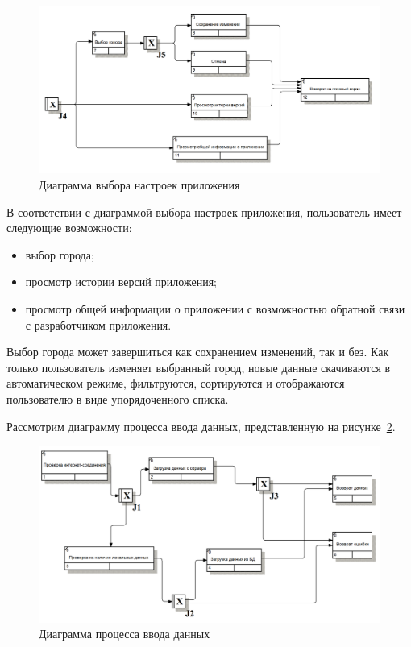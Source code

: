 \begin{figure}[h!]
  \centering
  \includegraphics[width=150mm]{pic/idef3_settings}
  \caption{Диаграмма выбора настроек приложения}
  \label{fig:idef3_settings}
\end{figure}

В соответствии с диаграммой выбора настроек приложения,
пользователь имеет следующие возможности:
\begin{itemize}
  \item выбор города;
  \item просмотр истории версий приложения;
  \item просмотр общей информации о приложении с возможностью
    обратной связи с разработчиком приложения.
\end{itemize}

Выбор города может завершиться как сохранением изменений,
так и без. Как только пользователь изменяет выбранный город,
новые данные скачиваются в автоматическом режиме,
фильтруются, сортируются и отображаются пользователю в
виде упорядоченного списка.


\pagebreak
Рассмотрим диаграмму процесса ввода данных,
представленную на рисунке~\ref{fig:idef3_input}.

\begin{figure}[h!]
  \centering
  \includegraphics[width=150mm]{pic/IDEF3_load_data}
  \caption{Диаграмма процесса ввода данных}
  \label{fig:idef3_input}
\end{figure}

